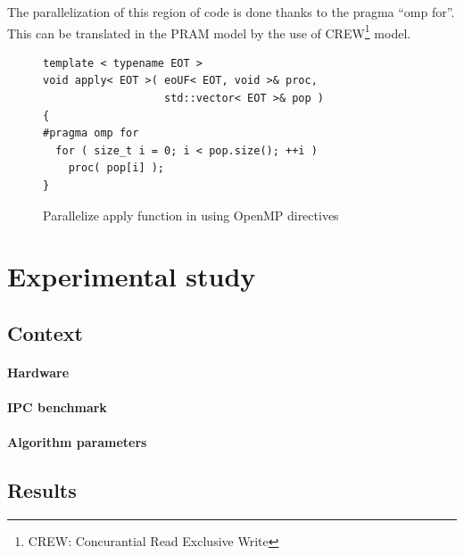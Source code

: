 \documentclass{sig-alternate}
\begin{document}
The parallelization of this region of code is done thanks to the pragma ``omp for''. This can be translated in the PRAM model by the use of CREW\footnote{CREW: Concurantial Read Exclusive Write} model.



\begin{figure}[here]
\centering
\begin{verbatim}
template < typename EOT >
void apply< EOT >( eoUF< EOT, void >& proc,
                   std::vector< EOT >& pop )
{
#pragma omp for
  for ( size_t i = 0; i < pop.size(); ++i )
    proc( pop[i] );
}
\end{verbatim}
\caption{Parallelize apply function in using OpenMP directives}
\end{figure}

\section{Experimental study}

\subsection{Context}

\paragraph{Hardware} %
\paragraph{IPC benchmark} %
\paragraph{Algorithm parameters} %

\subsection{Results}

\end{document}
